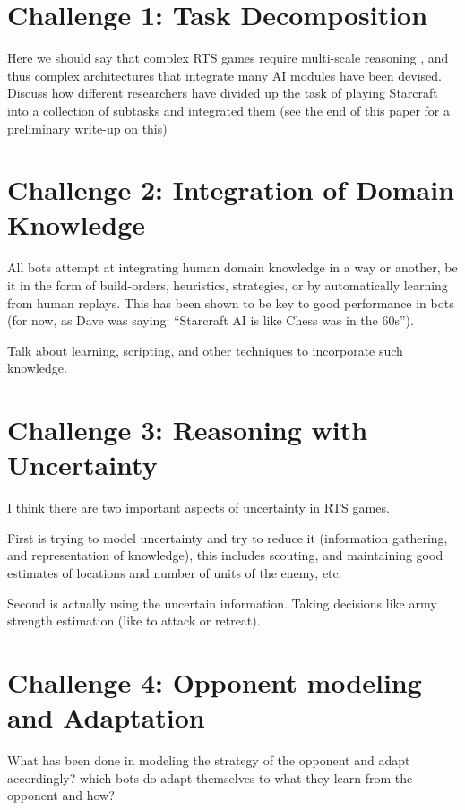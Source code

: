 \documentclass[journal]{IEEEtran}
\begin{document}
\section{Challenge 1: Task Decomposition}\label{sec:architecture}

{\color{blue}
Here we should say that complex RTS games require multi-scale reasoning \cite{WeberCig10}, and thus complex architectures that integrate many AI modules have been devised. Discuss how different researchers have divided up the task of playing Starcraft into a collection of subtasks and integrated them (see the end of this paper for a preliminary write-up on this)
}


\section{Challenge 2: Integration of Domain Knowledge}\label{sec:domainknowledge}

{\color{blue}
All bots attempt at integrating human domain knowledge in a way or another, be it in the form of build-orders, heuristics, strategies, or by automatically learning from human replays. This has been shown to be key to good performance in bots (for now, as Dave was saying: ``Starcraft AI is like Chess was in the 60s''). 

Talk about learning, scripting, and other techniques to incorporate such knowledge.
}

\section{Challenge 3: Reasoning with Uncertainty}\label{sec:uncertainty}

{\color{blue}
I think there are two important aspects of uncertainty in RTS games.

First is trying to model uncertainty and try to reduce it (information gathering, and representation of knowledge), this includes scouting, and maintaining good estimates of locations and number of units of the enemy, etc.

Second is actually using the uncertain information. Taking decisions like army strength estimation (like to attack or retreat).
}

\section{Challenge 4: Opponent modeling and Adaptation}\label{sec:adaptation}

{\color{blue}
What has been done in modeling the strategy of the opponent and adapt accordingly? which bots do adapt themselves to what they learn from the opponent and how?
}
\end{document}
